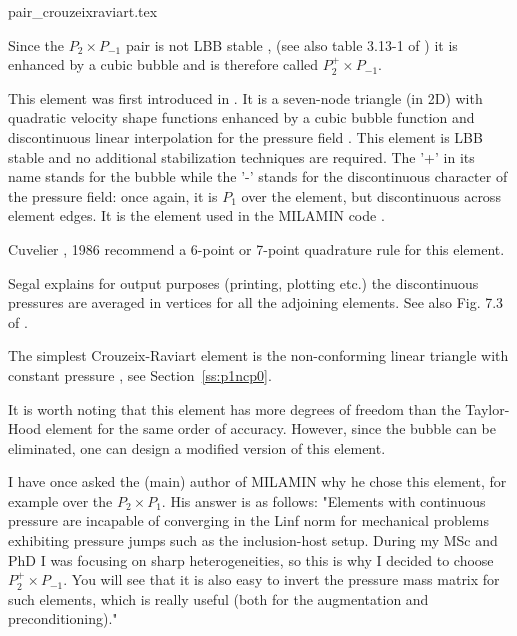 \begin{flushright} {\tiny {\color{gray} pair\_crouzeixraviart.tex}} \end{flushright}

Since the $P_2\times P_{-1}$ pair is not LBB stable \cite[p179]{reddybook2}, 
(see also table 3.13-1 of \textcite{grsa})
it is enhanced by a cubic bubble and is therefore called $P_2^+\times P_{-1}$. 

This element was first introduced in \cite{crra73}.
It is a seven-node triangle (in 2D) with quadratic velocity shape 
functions enhanced by a cubic bubble function and discontinuous linear interpolation for 
the pressure field \cite{cuss86}. 
This element is LBB stable and no additional stabilization techniques are required\cite{elsw}.
The '+' in its name stands for the bubble while the '-' stands for the discontinuous
character of the pressure field: once again, it is $P_1$ over the element, but discontinuous
across element edges.
It is the element used in the MILAMIN code \cite{daks08}.

\begin{remark}
Cuvelier \etal, 1986 \cite{cuss86} recommend a 6-point or 7-point quadrature rule for this element.
\end{remark}

\begin{remark}
Segal \cite{segal} explains 
for output purposes (printing, plotting etc.) the discontinuous pressures are averaged 
in vertices for all the adjoining elements. See also Fig. 7.3 of \cite{cuss86}.
\end{remark}

\begin{remark}
The simplest Crouzeix-Raviart element is the non-conforming linear triangle 
with constant pressure \cite{cuss86}, see Section~\ref{ss:p1ncp0}.
\end{remark}

It is worth noting that this element has more degrees of freedom  than the 
Taylor-Hood element for the same order of accuracy. However, since the 
bubble can be eliminated, one can design a modified version of this element.

\begin{remark}
I have once asked the (main) author of MILAMIN why he chose this element, for 
example over the $P_2\times P_1$. His answer is as follows:
"Elements with continuous pressure  are incapable of converging in the Linf 
norm for mechanical problems exhibiting pressure jumps such as the inclusion-host setup. 
During my MSc and PhD I was focusing on sharp heterogeneities, so this is why I decided 
to choose $P_2^+\times P_{-1}$. 
You will see that it is also easy to invert the pressure mass matrix for such elements, 
which is really useful (both for the augmentation and preconditioning)."
\end{remark}

